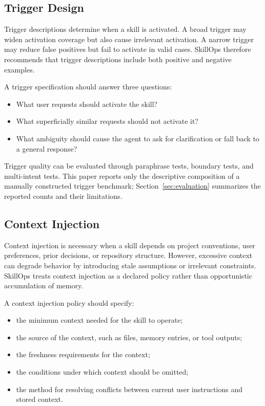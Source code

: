 \documentclass[11pt]{article}
\begin{document}
\subsection{Trigger Design}

Trigger descriptions determine when a skill is activated. A broad trigger may
widen activation coverage but also cause irrelevant activation. A narrow trigger may
reduce false positives but fail to activate in valid cases. SkillOps therefore
recommends that trigger descriptions include both positive and negative
examples.

A trigger specification should answer three questions:

\begin{itemize}[leftmargin=*]
    \item What user requests should activate the skill?
    \item What superficially similar requests should not activate it?
    \item What ambiguity should cause the agent to ask for clarification or
    fall back to a general response?
\end{itemize}

Trigger quality can be evaluated through paraphrase tests, boundary tests, and
multi-intent tests. This paper reports only the descriptive composition of a
manually constructed trigger benchmark; Section~\ref{sec:evaluation}
summarizes the reported counts and their limitations.

\subsection{Context Injection}

Context injection is necessary when a skill depends on project conventions,
user preferences, prior decisions, or repository structure. However, excessive
context can degrade behavior by introducing stale assumptions or irrelevant
constraints. SkillOps treats context injection as a declared policy rather than
opportunistic accumulation of memory.

A context injection policy should specify:

\begin{itemize}[leftmargin=*]
    \item the minimum context needed for the skill to operate;
    \item the source of the context, such as files, memory entries, or tool
    outputs;
    \item the freshness requirements for the context;
    \item the conditions under which context should be omitted;
    \item the method for resolving conflicts between current user instructions
    and stored context.
\end{itemize}
\end{document}
